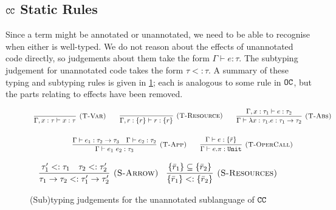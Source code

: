 \subsection{$\mathtt{CC}$ Static Rules}

Since a term might be annotated or unannotated, we need to be able to recognise when either is well-typed. We do not reason about the effects of unannotated code directly, so judgements about them take the form $\Gamma \vdash e: \tau$. The subtyping judgement for unannotated code takes the form $\tau <: \tau$. A summary of these typing and subtyping rules is given in \ref{fig:unannotated_static_rules}; each is analogous to some rule in $\mathtt{OC}$, but the parts relating to effects have been removed.

\begin{figure}[h]


\[
\begin{array}{c}


\infer[\textsc{(T-Var)}]
	{\Gamma, x: \tau \vdash x: \tau}
	{}
~~~~~~
\infer[\textsc{(T-Resource)}]
	{\Gamma, r: \{ r \} \vdash r : \{ r \}}
	{}

~~~~~~
\infer[\textsc{(T-Abs)}]
	{\Gamma \vdash \lambda x: \tau_1.e : \tau_1 \rightarrow \tau_2}
	{\Gamma, x: \tau_1 \vdash e: \tau_2}\\[4ex]
	
\infer[\textsc{(T-App)}]
	{\Gamma \vdash e_1~e_2: \tau_3}
	{\Gamma \vdash e_1: \tau_2 \rightarrow \tau_3 & \Gamma \vdash e_2: \tau_2}
~~~~~~
\infer[\textsc{(T-OperCall)}]
	{\Gamma \vdash e.\pi: \kwa{Unit}}
	{\Gamma \vdash e: \{ \bar r \}}

\end{array}
\]



\fbox{$\tau <: \tau$}

\[
\begin{array}{c}

\infer[\textsc{(S-Arrow)}]
	{ \tau_1 \rightarrow \tau_2 <: \tau_1' \rightarrow \tau_2' }
	{ \tau_1' <: \tau_1 & \tau_2 <: \tau_2' }
	~~~
\infer[\textsc{(S-Resources)}]
	{ \{ \bar r_1 \} <: \{ \bar r_2 \} }
	{ \{ \bar r_1 \} \subseteq \{ \bar r_2 \} }

\end{array}
\]

\vspace{-7pt}
\caption{(Sub)typing judgements for the unannotated sublanguage of $\mathtt{CC}$}
\label{fig:unannotated_static_rules}
\end{figure}

